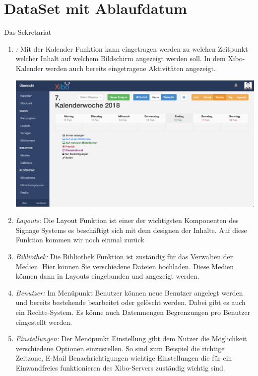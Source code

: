 \section{DataSet mit Ablaufdatum}\label{sec:datasetexpiredate}
Das Sekretariat 
 
\begin{enumerate}
  \item {\em :} Mit der Kalender Funktion kann eingetragen werden zu welchen Zeitpunkt welcher Inhalt auf welchem Bildschirm angezeigt werden soll. In dem Xibo-Kalender werden auch bereits eingetragene Aktivitäten angezeigt.
 
\begin{calendar}
  \centering
\includegraphics[width=1\textwidth]{images/xibo-basics-calendar}
  \label{Calendar}
\end{calendar}  
  
  \item {\em Layouts:} 
  Die Layout Funktion ist einer der wichtigsten Komponenten des Signage Systems es beschäftigt sich mit dem designen der Inhalte. Auf diese Funktion kommen wir noch einmal zurück
  
  \item {\em Bibliothek:} 
  Die Bibliothek Funktion ist zuständig für das Verwalten der Medien. Hier können Sie verschiedene Dateien hochladen.  Diese Medien können dann in Layouts eingebunden und angezeigt werden.
  
  \item {\em Benutzer:} 
  Im Menüpunkt Benutzer können neue Benutzer angelegt werden und bereits bestehende bearbeitet oder gelöscht werden. Dabei gibt es auch ein Rechte-System. Es könne auch Datenmengen Begrenzungen pro Benutzer eingestellt werden.
  
  \item {\em Einstellungen:} 
  Der Menöpunkt Einstellung gibt dem Nutzer die Möglichkeit verschiedene Optionen einzustellen. So sind zum Beispiel die richtige Zeitzone, E-Mail Benachrichtigungen wichtige Einstellungen die für ein Einwandfreies funktionieren des Xibo-Servers zuständig wichtig sind.
\end{enumerate}
 

